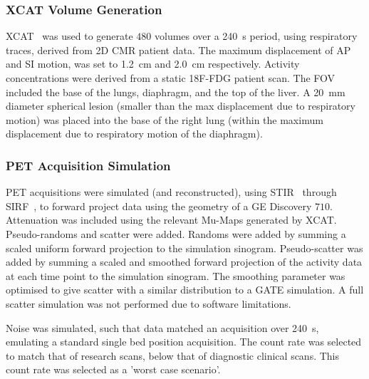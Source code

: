             
            \subsubsection{XCAT Volume Generation} \label{sec:xcat_volume_generation}
                \gls{XCAT}~\parencite{Segars2010} was used to generate $480$ volumes over a \SI{240}{\second} period, using respiratory traces, derived from \gls{2D} \gls{CMR} patient data. The maximum displacement of \gls{AP} and \gls{SI} motion, was set to \SI{1.2}{\centi\metre} and \SI{2.0}{\centi\metre} respectively. Activity concentrations were derived from a static \gls{18F-FDG} patient scan. The \gls{FOV} included the base of the lungs, diaphragm, and the top of the liver. A \SI{20}{\milli\metre} diameter spherical lesion (smaller than the max displacement due to respiratory motion) was placed into the base of the right lung (within the maximum displacement due to respiratory motion of the diaphragm).
            
            \subsubsection{PET Acquisition Simulation} \label{sec:pet_ct_motion_correction_exploiting_motion_models_fit_on_coarsely_gated_data_applied_to_finely_gated_data_methods_pet_acquisition_simulation}
                \gls{PET} acquisitions were simulated (and reconstructed), using \gls{STIR}~\parencite{Thielemans2012, Nikos2019} through \gls{SIRF}~\parencite{Ovtchinnikov2017}, to forward project data using the geometry of a \gls{GE} Discovery $710$. Attenuation was included using the relevant \glspl{Mu-Map} generated by \gls{XCAT}. Pseudo-randoms and scatter were added. Randoms were added by summing a scaled uniform forward projection to the simulation sinogram. Pseudo-scatter was added by summing a scaled and smoothed forward projection of the activity data at each time point to the simulation sinogram. The smoothing parameter was optimised to give scatter with a similar distribution to a GATE simulation. A full scatter simulation was not performed due to software limitations.
                
                Noise was simulated, such that data matched an acquisition over \SI{240}{\second}, emulating a standard single bed position acquisition. The count rate was selected to match that of research scans, below that of diagnostic clinical scans. This count rate was selected as a 'worst case scenario'.
                
